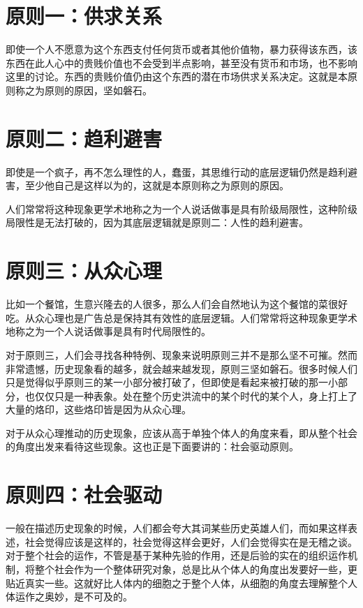 \documentclass[12pt,oneside]{book}
\begin{document}
\section{原则一：供求关系}

即使一个人不愿意为这个东西支付任何货币或者其他价值物，暴力获得该东西，该东西在此人心中的贵贱价值也不会受到半点影响，甚至没有货币和市场，也不影响这里的讨论。东西的贵贱价值仍由这个东西的潜在市场供求关系决定。这就是本原则称之为原则的原因，坚如磐石。


\section{原则二：趋利避害}

即使是一个疯子，再不怎么理性的人，蠢蛋，其思维行动的底层逻辑仍然是趋利避害，至少他自己是这样以为的，这就是本原则称之为原则的原因。

人们常常将这种现象更学术地称之为一个人说话做事是具有阶级局限性，这种阶级局限性是无法打破的，因为其底层逻辑就是原则二：人性的趋利避害。


\section{原则三：从众心理}

比如一个餐馆，生意兴隆去的人很多，那么人们会自然地认为这个餐馆的菜很好吃。从众心理也是广告总是保持其有效性的底层逻辑。人们常常将这种现象更学术地称之为一个人说话做事是具有时代局限性的。

对于原则三，人们会寻找各种特例、现象来说明原则三并不是那么坚不可摧。然而非常遗憾，历史现象看的越多，就会越来越发现，原则三坚如磐石。很多时候人们只是觉得似乎原则三的某一小部分被打破了，但即使是看起来被打破的那一小部分，也仅仅只是一种表象。处在整个历史洪流中的某个时代的某个人，身上打上了大量的烙印，这些烙印皆是因为从众心理。

对于从众心理推动的历史现象，应该从高于单独个体人的角度来看，即从整个社会的角度出发来看待这些现象。这也正是下面要讲的：社会驱动原则。



\section{原则四：社会驱动}

一般在描述历史现象的时候，人们都会夸大其词某些历史英雄人们，而如果这样表述，社会觉得应该是这样的，社会觉得这样会更好，人们会觉得实在是无稽之谈。对于整个社会的运作，不管是基于某种先验的作用，还是后验的实在的组织运作机制，将整个社会作为一个整体研究对象，总是比从个体人的角度出发要好一些，更贴近真实一些。这就好比人体内的细胞之于整个人体，从细胞的角度去理解整个人体运作之奥妙，是不可及的。
\end{document}
